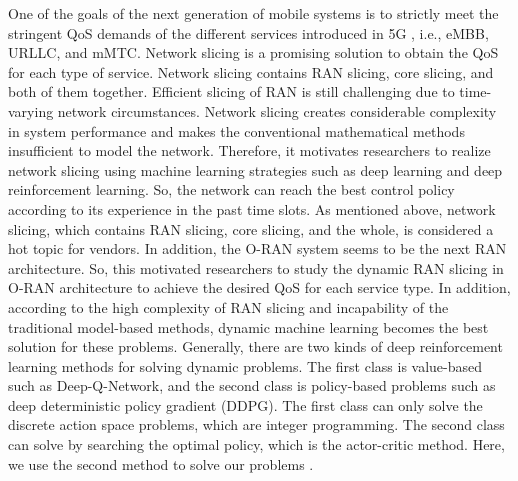 \documentclass{article}
\begin{document}
One of the goals of the next generation of mobile systems is to strictly meet the stringent QoS demands of the different services introduced in 5G , i.e., eMBB, URLLC, and mMTC. Network slicing is a promising solution to obtain the QoS for each type of service. Network slicing contains RAN slicing, core slicing, and both of them together. Efficient slicing of RAN is still challenging due to time-varying network circumstances.
Network slicing creates considerable complexity in system performance and makes the conventional mathematical methods insufficient to model the network.
Therefore, it motivates researchers to realize network slicing using machine learning strategies such as deep learning and deep reinforcement learning. So, the network can reach the best control policy according to its experience in the past time slots.
As mentioned above, network slicing, which contains RAN slicing, core slicing, and the whole, is considered a hot topic for vendors. In addition, the O-RAN system seems to be the next RAN architecture. So, this motivated researchers to study the dynamic RAN slicing in O-RAN architecture to achieve the desired QoS for each service type.
In addition, according to the high complexity of RAN slicing and incapability of the traditional model-based methods, dynamic machine learning becomes the best solution for these problems.
 Generally, there are two kinds of deep reinforcement learning methods for solving dynamic problems. The first class is value-based such as Deep-Q-Network, and the second class is policy-based problems such as
deep deterministic policy gradient (DDPG). The first class can only solve the discrete action space problems, which are integer programming. The second class can solve by searching the optimal policy, which is the actor-critic method. Here, we use the second method to solve our problems \cite{alsenwi2021intelligent,yan2019intelligent,mei2021intelligent}.
\end{document}
